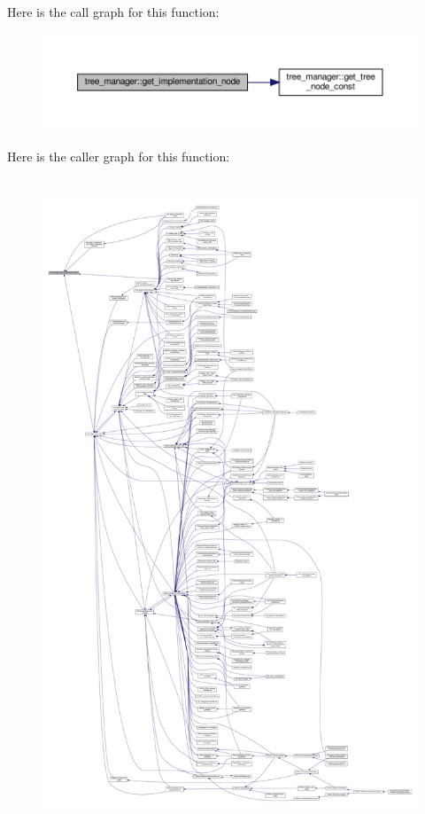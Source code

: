 Here is the call graph for this function\+:
\nopagebreak
\begin{figure}[H]
\begin{center}
\leavevmode
\includegraphics[width=350pt]{d2/ddd/classtree__manager_a5781a4878fd8df312cbff50cbd3837de_cgraph}
\end{center}
\end{figure}
Here is the caller graph for this function\+:
\nopagebreak
\begin{figure}[H]
\begin{center}
\leavevmode
\includegraphics[height=550pt]{d2/ddd/classtree__manager_a5781a4878fd8df312cbff50cbd3837de_icgraph}
\end{center}
\end{figure}
\mbox{\label{classtree__manager_aa5dda04faad12c65b907fe30f2e24213}} 
